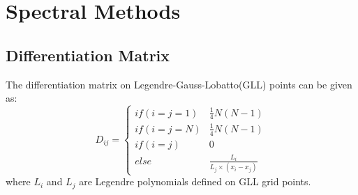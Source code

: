 \documentclass[12pt]{report}
\begin{document}
\appendix

\chapter{Spectral Methods}
\section{ Differentiation Matrix \label{Diff}}
The differentiation matrix on Legendre-Gauss-Lobatto(GLL) points can be given as:
\begin{equation}
\label{eq:100}
D_{ij}=
\left\{\begin{matrix}
if(i=j=1 ) & \frac{1}{4}N(N-1)\\ 
if(i=j=N) & \frac{1}{4}N(N-1) \\ 
if(i=j) & 0\\ 
else &  \frac{L_i}{L_j \times (x_i - x_j)}
\end{matrix}\right.
\end{equation}
where $L_i$ and $L_j$ are Legendre polynomials defined on GLL grid points.
\end{document}
